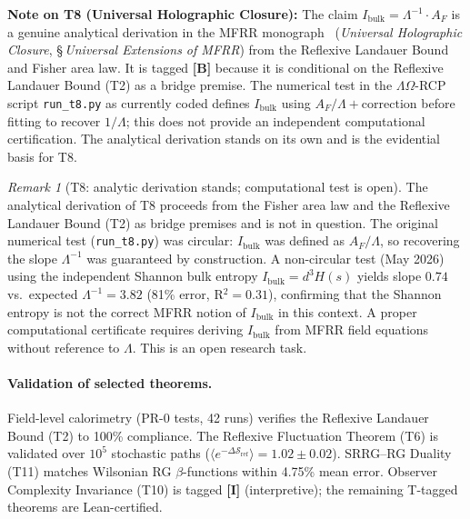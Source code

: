 \documentclass[11pt]{article}
\newcommand{\tagB}{\textbf{[B]}}
\newcommand{\tagI}{\textbf{[I]}}
\theoremstyle{plain}
\theoremstyle{definition}
\theoremstyle{remark}
\newtheorem{remark}[theorem]{Remark}
\begin{document}
\medskip
\noindent\textbf{Note on T8 (Universal Holographic Closure):}
The claim $I_\mathrm{bulk} = \Lambda^{-1} \cdot A_F$ is a genuine analytical derivation
in the MFRR monograph~\cite{SpivackMFRR} (\textit{Universal Holographic Closure},
\S\,\textit{Universal Extensions of MFRR}) from the Reflexive Landauer Bound and Fisher area law.
It is tagged \tagB{} because it is conditional on the Reflexive Landauer Bound (T2) as a bridge premise.
The numerical test in the $\Lambda\Omega$-RCP script \texttt{run\_t8.py} as currently coded
defines $I_\mathrm{bulk}$ using $A_F/\Lambda + \text{correction}$ before fitting to recover $1/\Lambda$;
this does not provide an independent computational certification.
The analytical derivation stands on its own and is the evidential basis for T8.

\begin{remark}[T8: analytic derivation stands; computational test is open]
The analytical derivation of T8 proceeds from the Fisher area law and the Reflexive Landauer
Bound (T2) as bridge premises and is not in question.
The original numerical test (\texttt{run\_t8.py}) was circular: $I_\mathrm{bulk}$ was defined
as $A_F/\Lambda$, so recovering the slope $\Lambda^{-1}$ was guaranteed by construction.
A non-circular test (May 2026) using the independent Shannon bulk entropy
$I_\mathrm{bulk} = d^3 H(s)$ yields slope $0.74$ vs.\ expected $\Lambda^{-1} = 3.82$
(81\% error, R$^2 = 0.31$), confirming that the Shannon entropy is not the correct
MFRR notion of $I_\mathrm{bulk}$ in this context.
A proper computational certificate requires deriving $I_\mathrm{bulk}$ from MFRR field equations
without reference to $\Lambda$.  This is an open research task.
\end{remark}

\paragraph{Validation of selected theorems.}
Field-level calorimetry (PR-0 tests, 42 runs) verifies the Reflexive Landauer Bound (T2) to 100\%
compliance.  The Reflexive Fluctuation Theorem (T6) is validated over $10^5$ stochastic paths
($\langle e^{-\Delta\mathcal{S}_\mathrm{ref}}\rangle = 1.02 \pm 0.02$).
SRRG--RG Duality (T11) matches Wilsonian RG $\beta$-functions within 4.75\% mean error.
Observer Complexity Invariance (T10) is tagged \tagI{} (interpretive); the remaining T-tagged
theorems are Lean-certified.

\end{document}
